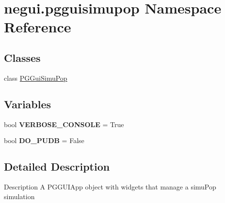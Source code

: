 \hypertarget{namespacenegui_1_1pgguisimupop}{}\section{negui.\+pgguisimupop Namespace Reference}
\label{namespacenegui_1_1pgguisimupop}
\subsection*{Classes}
\begin{DoxyCompactItemize}
\item 
class \hyperlink{classnegui_1_1pgguisimupop_1_1PGGuiSimuPop}{P\+G\+Gui\+Simu\+Pop}
\end{DoxyCompactItemize}
\subsection*{Variables}
\begin{DoxyCompactItemize}
\item 
bool {\bfseries V\+E\+R\+B\+O\+S\+E\+\_\+\+C\+O\+N\+S\+O\+LE} = True\hypertarget{namespacenegui_1_1pgguisimupop_ab33528082ee51ae88db3bcc14a553121}{}\label{namespacenegui_1_1pgguisimupop_ab33528082ee51ae88db3bcc14a553121}

\item 
bool {\bfseries D\+O\+\_\+\+P\+U\+DB} = False\hypertarget{namespacenegui_1_1pgguisimupop_a7828b4058072779ad8f76eaa79a87952}{}\label{namespacenegui_1_1pgguisimupop_a7828b4058072779ad8f76eaa79a87952}

\end{DoxyCompactItemize}


\subsection{Detailed Description}
\begin{DoxyVerb}Description
A PGGUIApp object with widgets that manage a simuPop simulation
\end{DoxyVerb}
 